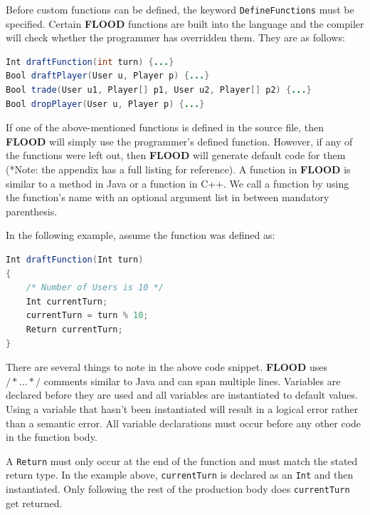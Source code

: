 \documentclass[12pt]{report}
\begin{document}
Before custom functions can be defined, the keyword \texttt{DefineFunctions} must be specified. Certain \textbf{FLOOD} functions are built into the language and the compiler will check whether the programmer has overridden them. They are as follows:

\begin{singlespace}
\begin{lstlisting}[language=Java,label=some-code,caption={Predefined FLOOD functions.}]
Int draftFunction(int turn) {...}
Bool draftPlayer(User u, Player p) {...}
Bool trade(User u1, Player[] p1, User u2, Player[] p2) {...}
Bool dropPlayer(User u, Player p) {...}
\end{lstlisting}
\end{singlespace}

If one of the above-mentioned functions is defined in the source file, then \textbf{FLOOD} will simply use the programmer's defined function. However, if any of the functions were left out, then \textbf{FLOOD} will generate default code for them (*Note: the appendix has a full listing for reference). A function in \textbf{FLOOD} is similar to a method in Java or a function in C++. We call a function by using the function's name with an optional argument list in between mandatory parenthesis.

In the following example, assume the function was defined as:

\begin{singlespace}
\begin{lstlisting}[language=Java,label=some-code,caption=Predefined FLOOD functions]
Int draftFunction(Int turn)
{
	/* Number of Users is 10 */
	Int currentTurn;
	currentTurn = turn % 10;
	Return currentTurn;
}
\end{lstlisting}
\end{singlespace}

There are several things to note in the above code snippet. \textbf{FLOOD} uses $/*\ldots*/$ comments similar to Java and can span multiple lines. Variables are declared before they are used and all variables are instantiated to default values. Using a variable that hasn't been instantiated will result in a logical error rather than a semantic error. All variable declarations must occur before any other code in the function body. 

A \texttt{Return} must only occur at the end of the function and must match the stated return type. In the example above, \texttt{currentTurn} is declared as an \texttt{Int} and then instantiated. Only following the rest of the production body does \texttt{currentTurn} get returned.
\end{document}
